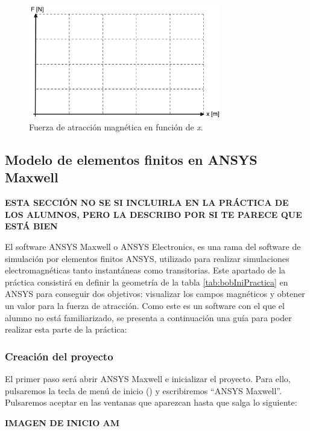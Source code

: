 \begin{figure}[H]
    \centering 
    \includegraphics[width=0.75\textwidth]{FigurasMemoria/grafFuerzaPractica.png}
    \caption{Fuerza de atracción magnética en función de \textit{x}.}
    \label{fig:grafFuerzaPractica} %
\end{figure}

\subsection*{Modelo de elementos finitos en ANSYS Maxwell}

\textbf{ESTA SECCIÓN NO SE SI INCLUIRLA EN LA PRÁCTICA DE LOS ALUMNOS, PERO LA DESCRIBO POR SI TE PARECE QUE ESTÁ BIEN}

El software ANSYS Maxwell o ANSYS Electronics, es una rama del software de simulación por elementos finitos ANSYS, utilizado para realizar simulaciones electromagnéticas tanto instantáneas como transitorias. Este apartado de la práctica consistirá en definir la geometría de la tabla \ref{tab:bobIniPractica} en ANSYS para conseguir dos objetivos: visualizar los campos magnéticos y obtener un valor para la fuerza de atracción. Como este es un software con el que el alumno no está familiarizado, se presenta a continuación una guía para poder realizar esta parte de la práctica:

\subsubsection*{Creación del proyecto}

El primer paso será abrir ANSYS Maxwell e inicializar el proyecto. Para ello, pulsaremos la tecla de menú de inicio (\faWindows{}) y escribiremos ``ANSYS Maxwell''. Pulsaremos aceptar en las ventanas que aparezcan hasta que salga lo siguiente:

\textbf{IMAGEN DE INICIO AM}

